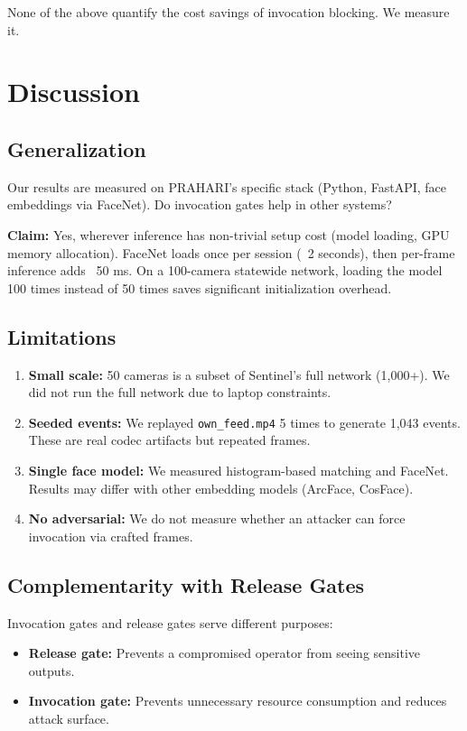 \documentclass[sigplan,review]{acmart}
\begin{document}
None of the above quantify the cost savings of invocation blocking. We measure it.

\section{Discussion}

\subsection{Generalization}

Our results are measured on PRAHARI's specific stack (Python, FastAPI, face embeddings via FaceNet).
Do invocation gates help in other systems?

\textbf{Claim:} Yes, wherever inference has non-trivial setup cost (model loading, GPU memory allocation).
FaceNet loads once per session (~2 seconds), then per-frame inference adds ~50 ms. On a 100-camera
statewide network, loading the model 100 times instead of 50 times saves significant initialization overhead.

\subsection{Limitations}

\begin{enumerate}
  \item \textbf{Small scale:} 50 cameras is a subset of Sentinel's full network (1,000+). We did not run
    the full network due to laptop constraints.
  \item \textbf{Seeded events:} We replayed \texttt{own\_feed.mp4} 5 times to generate 1,043 events.
    These are real codec artifacts but repeated frames.
  \item \textbf{Single face model:} We measured histogram-based matching and FaceNet. Results may differ
    with other embedding models (ArcFace, CosFace).
  \item \textbf{No adversarial:} We do not measure whether an attacker can force invocation via crafted frames.
\end{enumerate}

\subsection{Complementarity with Release Gates}

Invocation gates and release gates serve different purposes:
\begin{itemize}
  \item \textbf{Release gate:} Prevents a compromised operator from seeing sensitive outputs.
  \item \textbf{Invocation gate:} Prevents unnecessary resource consumption and reduces attack surface.
\end{itemize}
\end{document}
